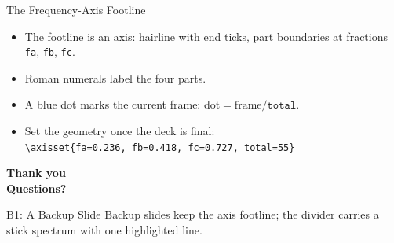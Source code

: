 \documentclass[aspectratio=169,11pt]{beamer}
\begin{document}
\begin{frame}{The Frequency-Axis Footline}
  \begin{itemize}
    \item The footline is an axis: hairline with end ticks, part
          boundaries at fractions \texttt{fa}, \texttt{fb}, \texttt{fc}.
    \item Roman numerals label the four parts.
    \item A blue dot marks the current frame:
          $\mathrm{dot} = \mathrm{frame}/\texttt{total}$.
    \item Set the geometry once the deck is final:\\[0.3em]
      \texttt{\textbackslash axisset\{fa=0.236, fb=0.418, fc=0.727, total=55\}}
  \end{itemize}
\end{frame}

\begin{frame}[plain]
  \begin{center}
    \Large\bfseries Thank you\\[0.6em]
    \large Questions?
  \end{center}
\end{frame}


\begin{frame}{B1: A Backup Slide}
  Backup slides keep the axis footline; the divider carries a
  stick spectrum with one highlighted line.
\end{frame}
\end{document}
